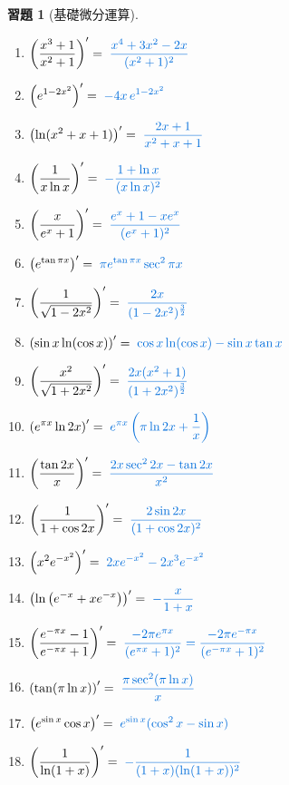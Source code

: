 \documentclass[12pt]{extarticle}
\newcommand{\ds}{\displaystyle}
\theoremstyle{definition}
\newtheorem*{exe}{習題}
\begin{document}
\begin{exe}[基礎微分運算]
\begin{multicols}{2}
\begin{enumerate}
      \item $\ds\left(\frac{x^3 + 1}{x^2 + 1}\right)' = {\color{C2}\;\frac{x^4 + 3x^2 - 2x}{(x^2 + 1)^2}}$
      \item $\ds\left(e^{1- 2x^2}\right)' = {\color{C2}\;-4x\,e^{1 - 2x^2}}$
      \item $\ds\left(\ln(x^2 + x + 1)\right)' = {\color{C2}\;\frac{2x + 1}{x^2 + x + 1}}$
      \item $\ds\left(\frac{1}{x \ln x}\right)' = {\color{C2}\;-\frac{1 + \ln x}{(x\ln x)^2}}$
      \item $\ds\left(\frac{x}{e^x + 1}\right)' = {\color{C2}\;\frac{e^x + 1 - xe^x}{(e^x + 1)^2}}$
      \item $\ds\left(e^{\tan\pi x}\right)' = {\color{C2}\;\pi e^{\tan\pi x}\sec^2\pi x}$
      \item $\ds\left(\frac{1}{\sqrt{1 - 2x^2}}\right)' = {\color{C2}\;\frac{2x}{(1 - 2x^2)^{\frac{3}{2}}}}$
      \item $\ds\left(\sin x\ln(\cos x)\right)' = {\color{C2}\;\cos x\ln(\cos x) - \sin x\tan x}$
      \item $\ds\left(\frac{x^2}{\sqrt{1 + 2x^2}}\right)' = {\color{C2}\;\frac{2x(x^2 + 1)}{(1 + 2x^2)^{\frac{3}{2}}}}$
      \item $\ds\left(e^{\pi x}\ln 2x\right)' = {\color{C2}\;e^{\pi x}\left(\pi\ln 2x + \frac{1}{x}\right)}$
      \item $\ds\left(\frac{\tan 2x}{x}\right)' = {\color{C2}\;\frac{2x\sec^2 2x - \tan 2x}{x^2}}$
      \item $\ds\left(\frac{1}{1 + \cos2x}\right)' = {\color{C2}\;\frac{2\sin 2x}{(1 + \cos 2x)^2}}$
      \item $\ds\left(x^2 e^{-x^2}\right)' = {\color{C2}\;2xe^{-x^2} - 2x^3 e^{-x^2}}$
      \item $\ds\left(\ln\left(e^{-x} + xe^{-x}\right)\right)' = {\color{C2}\;-\frac{x}{1 + x}}$
      \item $\ds\left(\frac{e^{-\pi x} - 1}{e^{-\pi x} + 1}\right)' = {\color{C2}\;\frac{-2\pi e^{\pi x}}{(e^{\pi x} + 1)^2} = \frac{-2\pi e^{-\pi x}}{(e^{-\pi x} + 1)^2}}$
      \item $\ds\left(\tan(\pi\ln x)\right)' = {\color{C2}\;\frac{\pi\sec^2(\pi\ln x)}{x}}$
      \item $\ds\left(e^{\sin x}\cos x\right)' = {\color{C2}\;e^{\sin x}(\cos^2x - \sin x)}$
      \item $\ds\left(\frac{1}{\ln(1 + x)}\right)' = {\color{C2}\;-\frac{1}{(1 + x)(\ln(1 + x))^2}}$

\end{enumerate}
\end{multicols}
\end{exe}
\end{document}
